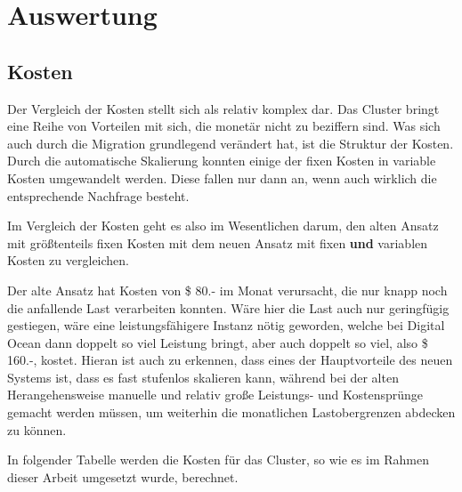 \chapter{Auswertung}
\label{cha:Auswertung}


\section{Kosten}

Der Vergleich der Kosten stellt sich als relativ komplex dar.
Das Cluster bringt eine Reihe von
Vorteilen mit sich, die monetär nicht zu beziffern sind.
Was sich auch durch die Migration grundlegend verändert hat, ist die Struktur der
Kosten.
Durch die automatische
Skalierung konnten einige der fixen Kosten in variable
Kosten umgewandelt werden.
Diese fallen nur dann an, wenn auch wirklich die entsprechende
Nachfrage besteht.

Im Vergleich der Kosten geht es also im Wesentlichen darum, den alten Ansatz mit
größtenteils fixen Kosten mit dem neuen Ansatz mit fixen \textbf{und} variablen Kosten
zu vergleichen.

Der alte Ansatz hat Kosten von \$ 80.- im Monat verursacht, die nur knapp noch die
anfallende Last verarbeiten konnten. Wäre hier die Last auch nur geringfügig
gestiegen, wäre eine leistungsfähigere Instanz nötig geworden,
welche bei Digital Ocean dann doppelt so viel Leistung bringt,
aber auch doppelt so viel, also \$ 160.-, kostet.
Hieran ist auch zu erkennen, dass eines der Hauptvorteile des neuen Systems ist, dass
es fast stufenlos skalieren kann, während bei der alten Herangehensweise
manuelle und relativ
große Leistungs- und Kostensprünge gemacht werden müssen, um weiterhin
die monatlichen Lastobergrenzen abdecken zu können.

In folgender Tabelle werden die Kosten für das Cluster, so wie es im
Rahmen dieser Arbeit umgesetzt wurde, berechnet.

